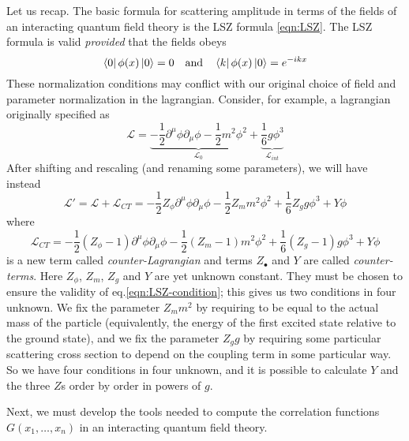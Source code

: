 \documentclass[../main/main.tex]{subfiles}
\begin{document}
Let us recap. The basic formula for scattering amplitude in terms of the fields of an interacting quantum field theory is the LSZ formula \eqref{eqn:LSZ}. The LSZ formula is valid \emph{provided} that the fields obeys
\begin{equation}\label{eqn:LSZ-condition}
\bra0\phi(x)\ket0=0\quad\text{and}\quad\bra k\phi(x)\ket0=e^{-ikx}
\end{equation}
These normalization conditions may conflict with our original choice of field and parameter normalization in the lagrangian. Consider, for example, a lagrangian originally specified as
\[\mathcal L=\underbrace{-\frac12\partial^\mu\phi\partial_\mu\phi-\frac12m^2\phi^2}_{\mathcal L_0}+\underbrace{\frac16g\phi^3}_{\mathcal L_{int}}\]
After shifting and rescaling (and renaming some parameters), we will have instead
\[\mathcal L'=\mathcal L+\mathcal L_{CT}=-\frac12Z_\phi\partial^\mu\phi\partial_\mu\phi-\frac12Z_mm^2\phi^2+\frac16Z_gg\phi^3+Y\phi\]
where
\[\mathcal L_{CT}=-\frac12(Z_\phi-1)\partial^\mu\phi\partial_\mu\phi-\frac12(Z_m-1)m^2\phi^2+\frac16(Z_g-1)g\phi^3+Y\phi\]
is a new term called \emph{counter-Lagrangian} and terms $Z_\bullet$ and $Y$ are called \emph{counter-terms}.
Here $Z_\phi$, $Z_m$, $Z_g$ and $Y$ are yet unknown constant. They must be chosen to ensure the validity of eq.\eqref{eqn:LSZ-condition}; this gives us two conditions in four unknown. We fix the parameter $Z_mm^2$ by requiring  to be equal to the actual mass of the particle (equivalently, the energy of the first excited state relative to the ground state), and we fix the parameter $Z_gg$ by requiring some particular scattering cross section to depend on the coupling term in some particular way. So we have four conditions in four unknown, and it is possible to calculate $Y$ and the three $Z$s order by order in powers of $g$.

Next, we must develop the tools needed to compute the correlation functions $G(x_1,\dots,x_n)$ in an interacting quantum field theory.
\end{document}
